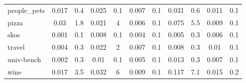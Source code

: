 {\begin{table*}[h]
\begin{tabular}{| l | c  c | c  c | c  c | c  c | c  c |}
people\_pets                & 0.017 & 0.4  & 0.025 & 0.1 & 0.007 & 0.1      & 0.031 & 0.6  & 0.011 & 0.1  \\
pizza                       & 0.03  & 1.8  & 0.021 & 4   & 0.006 & 0.1      & 0.075 & 5.5  & 0.009 & 0.1  \\
skos                        & 0.001 & 0.1  & 0.008 & 0.1 & 0.004 & 0.1      & 0.005 & 0.3  & 0.006 & 0.1  \\
travel                      & 0.004 & 0.3  & 0.022 & 2   & 0.007 & 0.1      & 0.008 & 0.3  & 0.01  & 0.1  \\
univ-bench                  & 0.002 & 0.3  & 0.01  & 0.1 & 0.005 & 0.1      & 0.013 & 0.3  & 0.007 & 0.1  \\
wine                        & 0.017 & 3.5  & 0.032 & 6   & 0.009 & 0.1      & 0.117 & 7.1  & 0.015 & 0.2  \\
    \hline
  \end{tabular}
\end{table*}
}

